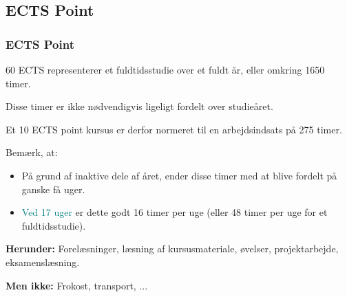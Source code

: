 \documentclass[t, aspectratio=169]{beamer}
\begin{document}
\subsection{ECTS Point}
\begin{frame}[fragile]
  \frametitle{ECTS Point}
  \vspace{1mm}
  60 ECTS representerer et fuldtidsstudie over et fuldt år, eller omkring 1650 timer.
  
  \vspace{3mm}
  Disse timer er ikke nødvendigvis ligeligt fordelt over studieåret.

  \vspace{3mm}
  Et 10 ECTS point kursus er derfor normeret til en arbejdsindsats på 275 timer.
  
  \pause
  \vspace{3mm}
  Bemærk, at:
  \begin{itemize}
    \item På grund af inaktive dele af året, ender disse timer med at blive fordelt på ganske få uger.
    \item \textcolor{teal}{Ved 17 uger} er dette godt 16 timer per uge (eller 48 timer per uge for et fuldtidsstudie).
  \end{itemize}
  
  \pause
  \vspace{3mm}
  \textbf{Herunder:} Forelæsninger, læsning af kursusmateriale, øvelser, projektarbejde,
  eksamenslæsning.
  
  \vspace{3mm}
  \textbf{Men ikke:} Frokost, transport, ...
\end{frame}
\end{document}
